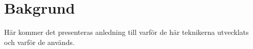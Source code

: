 \section{Bakgrund}
\label{sec:bjorn-background}

Här kommer det presenteras anledning till varför de här teknikerna utvecklats och varför de används.